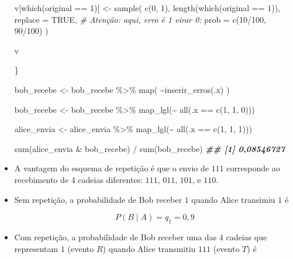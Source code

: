 \documentclass[
  11pt]{report}
\newenvironment{Shaded}{\begin{snugshade}}{\end{snugshade}}
\newcommand{\AttributeTok}[1]{\textcolor[rgb]{0.77,0.63,0.00}{#1}}
\newcommand{\CommentTok}[1]{\textcolor[rgb]{0.56,0.35,0.01}{\textit{#1}}}
\newcommand{\ConstantTok}[1]{\textcolor[rgb]{0.00,0.00,0.00}{#1}}
\newcommand{\DecValTok}[1]{\textcolor[rgb]{0.00,0.00,0.81}{#1}}
\newcommand{\DocumentationTok}[1]{\textcolor[rgb]{0.56,0.35,0.01}{\textbf{\textit{#1}}}}
\newcommand{\FunctionTok}[1]{\textcolor[rgb]{0.00,0.00,0.00}{#1}}
\newcommand{\NormalTok}[1]{#1}
\newcommand{\OtherTok}[1]{\textcolor[rgb]{0.56,0.35,0.01}{#1}}
\newcommand{\SpecialCharTok}[1]{\textcolor[rgb]{0.00,0.00,0.00}{#1}}
\renewenvironment{Shaded}{
    \begin{mdframed}[%
      roundcorner=2pt,%
      innerleftmargin=5pt,%
      innerrightmargin=5pt,%
      topline=true,%
      leftline=true,%
      rightline=true,%
      bottomline=true,%
      linewidth=0.5pt,%
      linecolor=black!20,%
      backgroundcolor=black!2,%
      skipabove=2ex,%
      skipbelow=2.5ex%
    ]%
  }
  {
    \end{mdframed}
  }
\begin{document}
\begin{itemize}
\begin{Shaded}
\begin{Highlighting}[]
\NormalTok{  v[}\FunctionTok{which}\NormalTok{(original }\SpecialCharTok{==} \DecValTok{1}\NormalTok{)] }\OtherTok{\textless{}{-}} 
    \FunctionTok{sample}\NormalTok{(}
      \FunctionTok{c}\NormalTok{(}\DecValTok{0}\NormalTok{, }\DecValTok{1}\NormalTok{), }
      \FunctionTok{length}\NormalTok{(}\FunctionTok{which}\NormalTok{(original }\SpecialCharTok{==} \DecValTok{1}\NormalTok{)),}
      \AttributeTok{replace =} \ConstantTok{TRUE}\NormalTok{,}
      \CommentTok{\# Atenção: aqui, erro é 1 virar 0:}
      \AttributeTok{prob =} \FunctionTok{c}\NormalTok{(}\DecValTok{10}\SpecialCharTok{/}\DecValTok{100}\NormalTok{, }\DecValTok{90}\SpecialCharTok{/}\DecValTok{100}\NormalTok{)  }
\NormalTok{    )}

\NormalTok{  v}

\NormalTok{\} }

\NormalTok{bob\_recebe }\OtherTok{\textless{}{-}}\NormalTok{ bob\_recebe }\SpecialCharTok{\%\textgreater{}\%} 
  \FunctionTok{map}\NormalTok{(}
    \SpecialCharTok{\textasciitilde{}}\FunctionTok{inserir\_erros}\NormalTok{(.x)  }
\NormalTok{  )}

\NormalTok{bob\_recebe }\OtherTok{\textless{}{-}} 
\NormalTok{  bob\_recebe }\SpecialCharTok{\%\textgreater{}\%} \FunctionTok{map\_lgl}\NormalTok{(}\SpecialCharTok{\textasciitilde{}} \FunctionTok{all}\NormalTok{(.x }\SpecialCharTok{==} \FunctionTok{c}\NormalTok{(}\DecValTok{1}\NormalTok{, }\DecValTok{1}\NormalTok{, }\DecValTok{0}\NormalTok{)))}

\NormalTok{alice\_envia }\OtherTok{\textless{}{-}} 
\NormalTok{  alice\_envia }\SpecialCharTok{\%\textgreater{}\%} \FunctionTok{map\_lgl}\NormalTok{(}\SpecialCharTok{\textasciitilde{}} \FunctionTok{all}\NormalTok{(.x }\SpecialCharTok{==} \FunctionTok{c}\NormalTok{(}\DecValTok{1}\NormalTok{, }\DecValTok{1}\NormalTok{, }\DecValTok{1}\NormalTok{)))}


\FunctionTok{sum}\NormalTok{(alice\_envia }\SpecialCharTok{\&}\NormalTok{ bob\_recebe) }\SpecialCharTok{/} \FunctionTok{sum}\NormalTok{(bob\_recebe)}
\DocumentationTok{\#\# [1] 0,08546727}
\end{Highlighting}
\end{Shaded}
\item
  A vantagem do esquema de repetição é que o envio de $111$ corresponde ao recebimento de $4$ cadeias diferentes: $111$, $011$, $101$, e $110$.
\item
  Sem repetição, a probabilidade de Bob receber $1$ quando Alice transimiu $1$ é

  \[
  P(B \mid A) = q_1 = 0{,}9
  \]
\item
  Com repetição, a probabilidade de Bob receber uma das $4$ cadeias que representam $1$ (evento $R$) quando Alice transmitiu $111$ (evento $T$) é


\end{itemize}
\end{document}

